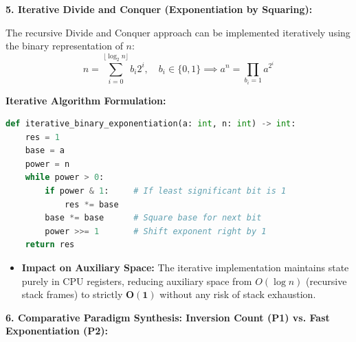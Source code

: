 \documentclass[12pt]{article}
\begin{document}
\textbf{5. Iterative Divide and Conquer (Exponentiation by Squaring):}

The recursive Divide and Conquer approach can be implemented iteratively using the binary representation of $n$:
\[
n = \sum_{i=0}^{\lfloor \log_2 n \rfloor} b_i 2^i, \quad b_i \in \{0, 1\} \implies a^n = \prod_{b_i = 1} a^{2^i}
\]

\textbf{Iterative Algorithm Formulation:}
\begin{lstlisting}[language=Python]
def iterative_binary_exponentiation(a: int, n: int) -> int:
    res = 1
    base = a
    power = n
    while power > 0:
        if power & 1:     # If least significant bit is 1
            res *= base
        base *= base      # Square base for next bit
        power >>= 1       # Shift exponent right by 1
    return res
\end{lstlisting}
\begin{itemize}
    \item \textbf{Impact on Auxiliary Space:} The iterative implementation maintains state purely in CPU registers, reducing auxiliary space from $O(\log n)$ (recursive stack frames) to strictly $\mathbf{O(1)}$ without any risk of stack exhaustion.
\end{itemize}

\vspace{0.3cm}

\textbf{6. Comparative Paradigm Synthesis: Inversion Count (P1) vs. Fast Exponentiation (P2):}

\begin{table}[H]
\centering
{}
\caption{Cross-Problem Synthesis of Divide and Conquer Implementations}
\end{table}
\end{document}
